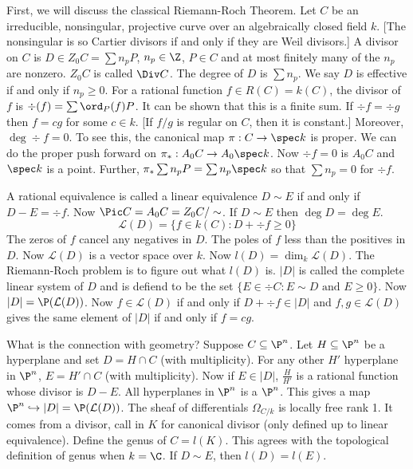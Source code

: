 First, we will discuss the classical Riemann-Roch Theorem. Let $C$ be an irreducible, nonsingular, projective curve over an algebraically closed field $k$. [The nonsingular is so Cartier divisors if and only if they are Weil divisors.] A divisor on $C$ is $D \in Z_0C=\sum n_p P$, $n_p \in \Z$, $P \in C$ and at most finitely many of the $n_p$ are nonzero. $Z_0C$ is called $\Div C$. The degree of $D$ is $\sum n_p$. We say $D$ is effective if and only if $n_p \geq 0$. For a rational function $f \in R(C)=k(C)$, the divisor of $f$ is $\div(f)= \sum \ord_P(f) P$. It can be shown that this is a finite sum. If $\div f= \div g$ then $f=cg$ for some $c \in k$. [If $f/g$ is regular on $C$, then it is constant.] Moreover, $\deg \div f=0$. To see this, the canonical map $\pi: C \to \spec k$ is proper. We can do the proper push forward on $\pi_*: A_0 C \to A_0 \spec k$. Now $\div f=0$ is $A_0C$ and $\spec k$ is a point. Further, $\pi_* \sum n_p P=\sum n_p \spec k$ so that $\sum n_p=0$ for $\div f$. 


A rational equivalence is called a linear equivalence $D \sim E$ if and only if $D-E=\div f$. Now $\Pic C=A_0C=Z_0C/\sim$. If $D \sim E$ then $\deg D=\deg E$. 
	\[
	\mathcal{L}(D)=\{f \in k(C) \colon D+ \div f \geq 0\}
	\]
The zeros of $f$ cancel any negatives in $D$. The poles of $f$ less than the positives in $D$. Now $\mathcal{L}(D)$ is a vector space over $k$. Now $l(D)=\dim_k \mathcal{L}(D)$. The Riemann-Roch problem is to figure out what $l(D)$ is. $|D|$ is called the complete linear system of $D$ and is defiend to be the set $\{E \in \div C \colon E \sim D \text{ and } E \geq 0\}$. Now $|D|=\P(\mathcal{L}(D))$. Now $f \in \mathcal{L}(D)$ if and only if $D+\div f \in |D|$ and $f,g \in \mathcal{L}(D)$ gives the same element of $|D|$ if and only if $f=cg$.


What is the connection with geometry? Suppose $C \subseteq \P^n$. Let $H \subseteq \P^n$ be a hyperplane and set $D=H \cap C$ (with multiplicity). For any other $H'$ hyperplane in $\P^n$, $E= H' \cap C$ (with multiplicity). Now if $E \in |D|$, $\frac{H}{H'}$ is a rational function whose divisor is $D-E$. All hyperplanes in $\P^n$ is a $\P^n$. This gives a map $\P^n \hookrightarrow |D|=\P(\mathcal{L}(D))$. The sheaf of differentials $\Omega_{C/k}$ is locally free rank 1. It comes from a divisor, call in $K$ for canonical divisor (only defined up to linear equivalence). Define the genus of $C=l(K)$. This agrees with the topological definition of genus when $k=\C$. If $D\sim E$, then $l(D)=l(E)$.

